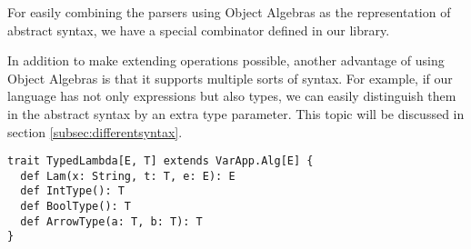 For easily combining the parsers using Object Algebras as the representation of abstract syntax, we have a special combinator  defined in our library.

In addition to make extending operations possible, another advantage of using Object Algebras is that it supports multiple sorts of syntax. For example, if our language has not only expressions but also types, we can easily distinguish them in the abstract syntax by an extra type parameter. This topic will be discussed in section \ref{subsec:differentsyntax}.

\begin{lstlisting}
trait TypedLambda[E, T] extends VarApp.Alg[E] {
  def Lam(x: String, t: T, e: E): E
  def IntType(): T
  def BoolType(): T
  def ArrowType(a: T, b: T): T
}
\end{lstlisting}



